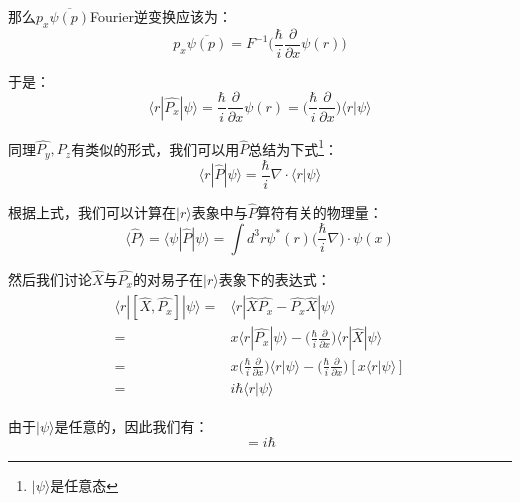         那么$p_x\overline{\psi(p)}$Fourier逆变换应该为：
        \begin{equation}
            p_x\overline{\psi(p)}=F^{-1}\Big(\frac{\hbar}{i}\frac{\partial}{\partial x}\psi(r)\Big)
        \end{equation}
        
        于是：
        \begin{equation}
            \langle r|\hat{P_x}|\psi\rangle=\frac{\hbar}{i}\frac{\partial}{\partial x}\psi(r)=\Big(\frac{\hbar}{i}\frac{\partial}{\partial x}\Big)\langle r|\psi\rangle
        \end{equation}

        同理$\hat{P_y},\hat{P_z}$有类似的形式，我们可以用$\hat{P}$总结为下式\footnote{$|\psi\rangle$是任意态}：
        \begin{equation}
            \langle r|\hat{P}|\psi\rangle=\frac{\hbar}{i}\nabla\cdot\langle r|\psi\rangle
        \end{equation}
        
        根据上式，我们可以计算在$|r\rangle$表象中与$\hat{P}$算符有关的物理量：
        \begin{equation}
            \langle \hat{P}\rangle=\langle \psi|\hat{P}|\psi\rangle=\int d^3 r\psi^*(r)\Big(\frac{\hbar}{i}\nabla\Big)\cdot \psi(x)
        \end{equation}
        
        然后我们讨论$\hat{X}$与$\hat{P_x}$的对易子在$|r\rangle$表象下的表达式：
        \begin{align}
            \begin{split}
                \langle r|[\hat{X},\hat{P_x}]|\psi\rangle=&\langle r|\hat{X}\hat{P_x}-\hat{P_x}\hat{X}|\psi\rangle\\
                =&x\langle r|\hat{P_x}|\psi\rangle-\Big(\frac{\hbar}{i}\frac{\partial}{\partial x}\Big)\langle r|\hat{X}|\psi\rangle\\
                =&x\Big(\frac{\hbar}{i}\frac{\partial}{\partial x}\Big)\langle r|\psi\rangle-\Big(\frac{\hbar}{i}\frac{\partial}{\partial x}\Big)[x\langle r|\psi\rangle]\\
                =&i\hbar\langle r|\psi\rangle
            \end{split}
        \end{align}
        
        由于$|\psi\rangle$是任意的，因此我们有：
        \begin{equation}
            [\hat{X},\hat{P_x}]=i\hbar
        \end{equation}
        
